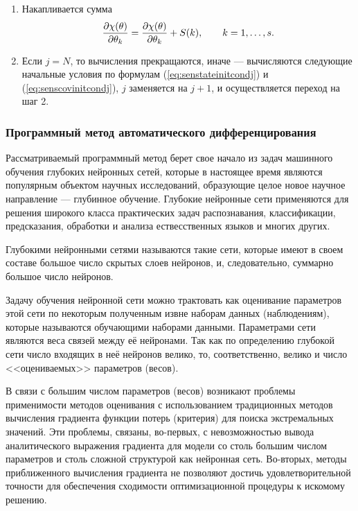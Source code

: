 \documentclass[a4paper,14pt]{extarticle}
\let\oldref\ref
\renewcommand{\ref}[1]{(\oldref{#1})}
\begin{document}
\begin{enumerate}
\item Накапливается сумма
\[
	\frac{\partial \chi(\theta)}{\partial \theta_k} = \frac{\partial \chi(\theta)}{\partial \theta_k} + S(k),
		\qquad k = 1, \ldots, s.
\]

\item Если $j = N$, то вычисления прекращаются, иначе --- вычисляются следующие
начальные условия по формулам \ref{eq:senstateinitcondj} и
\ref{eq:senscovinitcondj}, $j$ заменяется на $j + 1$, и осуществляется переход
на шаг 2.

\end{enumerate}

\subsubsection{Программный метод автоматического дифференцирования}

Рассматриваемый программный метод берет свое начало из задач машинного обучения
глубоких нейронных сетей, которые в настоящее время являются популярным
объектом научных исследований, образующие целое новое научное направление ---
глубинное обучение. Глубокие нейронные сети применяются для решения широкого
класса практических задач распознавания, классификации, предсказания, обработки
и анализа ествесственных языков и многих других.

Глубокими нейронными сетями называются такие сети, которые имеют в своем
составе большое число скрытых слоев нейронов, и, следовательно, суммарно
большое число нейронов.

Задачу обучения нейронной сети можно трактовать как оценивание параметров этой
сети по некоторым полученным извне наборам данных (наблюдениям), которые
называются обучающими наборами данными. Параметрами сети являются веса связей
между её нейронами. Так как по определению глубокой сети число входящих в неё
нейронов велико, то, соответственно, велико и число <<оцениваемых>> параметров
(весов).

В связи с большим числом параметров (весов) возникают проблемы применимости
методов оценивания с использованием традиционных методов вычисления градиента
функции потерь (критерия) для поиска экстремальных значений. Эти проблемы,
связаны, во-первых, с невозможностью вывода аналитического выражения градиента
для модели со столь большим числом параметров и столь сложной структурой как
нейронная сеть. Во-вторых, методы приближенного вычисления градиента не
позволяют достичь удовлетворительной точности для обеспечения сходимости
оптимизационной процедуры к искомому решению.
\end{document}
